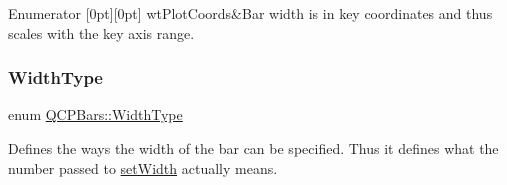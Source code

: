 \begin{DoxyEnumFields}{Enumerator}
[0pt][0pt]{}\mbox{\label{class_q_c_p_bars_a65dbbf1ab41cbe993d71521096ed4649a67f08c8d84085b506a42e7d85d14589a}} 
wt\+Plot\+Coords&Bar width is in key coordinates and thus scales with the key axis range. \\
\hline

\end{DoxyEnumFields}
\mbox{\label{class_q_c_p_bars_a65dbbf1ab41cbe993d71521096ed4649}} 
\subsubsection{\texorpdfstring{Width\+Type}{WidthType}\hspace{0.1cm}{\footnotesize\ttfamily [2/2]}}
{\footnotesize\ttfamily enum \hyperlink{class_q_c_p_bars_a65dbbf1ab41cbe993d71521096ed4649}{Q\+C\+P\+Bars\+::\+Width\+Type}}

Defines the ways the width of the bar can be specified. Thus it defines what the number passed to \hyperlink{class_q_c_p_bars_afec6116579d44d5b706e0fa5e5332507}{set\+Width} actually means.

